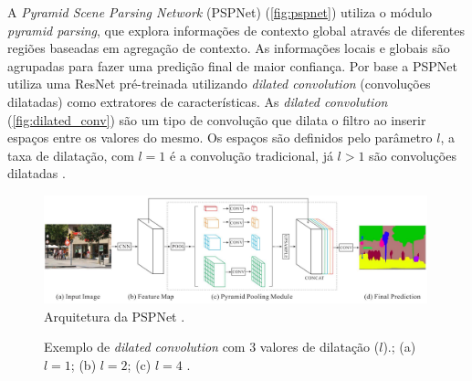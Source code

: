 \documentclass[12pt, a4paper, english, brazil]{article}
\newcommand{\textRed}[1]{{{\color{red} #1}}}
\begin{document}

A \textit{Pyramid Scene Parsing Network} (PSPNet) (\autoref{fig:pspnet}) utiliza o módulo \textit{pyramid parsing}, que explora informações de contexto global através de diferentes regiões baseadas em agregação de contexto. As informações locais e globais são agrupadas para fazer uma predição final de maior confiança. Por base a PSPNet utiliza uma ResNet pré-treinada utilizando \textit{dilated convolution} (convoluções dilatadas) como extratores de características. As \textit{dilated convolution} (\autoref{fig:dilated_conv}) são um tipo de convolução que dilata o filtro ao inserir espaços entre os valores do mesmo. Os espaços são definidos pelo parâmetro $l$, a taxa de dilatação, com $l = 1$ é a convolução tradicional, já $l > 1$ são convoluções dilatadas \cite{Zhao_2017, Minaee_2021}.

\begin{figure}[htb]
    \centering
    \includegraphics[width=0.99\textwidth]{img/pspnet.jpg}
    \caption{Arquitetura da PSPNet \cite{Zhao_2017}.}
    \label{fig:pspnet}
\end{figure}

\begin{figure}[htb]
    \centering
    \caption{Exemplo de \textit{dilated convolution} com 3 valores de dilatação ($l$).; (a) $l = 1$; (b) $l = 2$; (c) $l = 4$ \cite{Minaee_2021}.}
    \label{fig:dilated_conv}
\end{figure}
\end{document}
